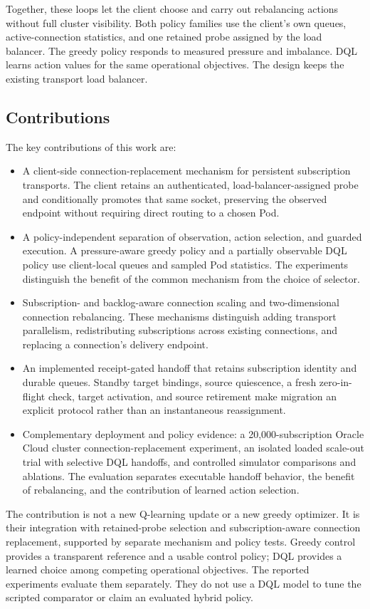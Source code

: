 Together, these loops let the client choose and carry out rebalancing actions without full cluster visibility. Both policy families use the client's own queues, active-connection statistics, and one retained probe assigned by the load balancer. The greedy policy responds to measured pressure and imbalance. DQL learns action values for the same operational objectives. The design keeps the existing transport load balancer.

\subsection*{Contributions}

The key contributions of this work are:

\begin{itemize}
	\item A client-side connection-replacement mechanism for persistent subscription transports. The client retains an authenticated, load-balancer-assigned probe and conditionally promotes that same socket, preserving the observed endpoint without requiring direct routing to a chosen Pod.
	
	\item A policy-independent separation of observation, action selection, and guarded execution. A pressure-aware greedy policy and a partially observable DQL policy use client-local queues and sampled Pod statistics. The experiments distinguish the benefit of the common mechanism from the choice of selector.
	
	\item Subscription- and backlog-aware connection scaling and two-dimensional connection rebalancing. These mechanisms distinguish adding transport parallelism, redistributing subscriptions across existing connections, and replacing a connection's delivery endpoint.
	
	\item An implemented receipt-gated handoff that retains subscription identity and durable queues. Standby target bindings, source quiescence, a fresh zero-in-flight check, target activation, and source retirement make migration an explicit protocol rather than an instantaneous reassignment.
	
	\item Complementary deployment and policy evidence: a 20,000-subscription Oracle Cloud cluster connection-replacement experiment, an isolated loaded scale-out trial with selective DQL handoffs, and controlled simulator comparisons and ablations. The evaluation separates executable handoff behavior, the benefit of rebalancing, and the contribution of learned action selection.
\end{itemize}

The contribution is not a new Q-learning update or a new greedy optimizer.
It is their integration with retained-probe selection and subscription-aware
connection replacement, supported by separate mechanism and policy tests.
Greedy control provides a transparent reference and a usable control policy;
DQL provides a learned choice among competing operational objectives. The
reported experiments evaluate them separately. They do not use a DQL model
to tune the scripted comparator or claim an evaluated hybrid policy.

